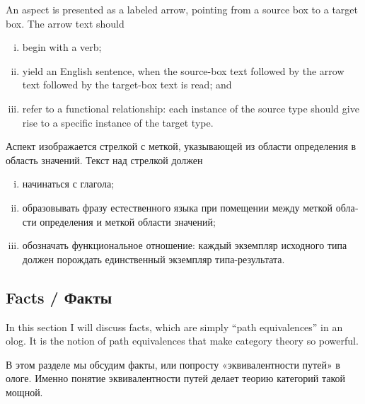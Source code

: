 \documentclass{book}
\theoremstyle{theoremENG}
\theoremstyle{lemmaENG}
\theoremstyle{propositionENG}
\theoremstyle{corollaryENG}
\theoremstyle{factENG}
\theoremstyle{remarkENG}
\theoremstyle{exampleENG}
\theoremstyle{warningENG}
\theoremstyle{questionENG}
\theoremstyle{guessENG}
\theoremstyle{answerENG}
\theoremstyle{constructionENG}
\theoremstyle{rulesENG}
\newtheorem{rulesENG}[subsubsection]{\begin{english}Rules of good practice\end{english}}
\theoremstyle{excENG}
\theoremstyle{appENG}
\theoremstyle{definitionENG}
\theoremstyle{notationENG}
\theoremstyle{conjectureENG}
\theoremstyle{postulateENG}
\theoremstyle{theoremRUS}
\theoremstyle{lemmaRUS}
\theoremstyle{propositionRUS}
\theoremstyle{corollaryRUS}
\theoremstyle{factRUS}
\theoremstyle{remarkRUS}
\theoremstyle{exampleRUS}
\theoremstyle{warningRUS}
\theoremstyle{questionRUS}
\theoremstyle{guessRUS}
\theoremstyle{answerRUS}
\theoremstyle{constructionRUS}
\theoremstyle{rulesRUS}
\newtheorem{rulesRUS}[subsubsection]{\begin{russian}Рекомендации\end{russian}}
\theoremstyle{excRUS}
\theoremstyle{appRUS}
\theoremstyle{definitionRUS}
\theoremstyle{notationRUS}
\theoremstyle{conjectureRUS}
\theoremstyle{postulateRUS}
\begin{document}
\begin{english}
\begin{rulesENG}\label{rules:aspects}
An aspect is presented as a labeled arrow, pointing from a source box to a target box.  The arrow text should
\begin{enumerate}[(i)]
\item begin with a verb;
\item yield an English sentence, when the source-box text followed by the arrow text followed by the target-box text is read; and
\item refer to a functional relationship: each instance of the source type should give rise to a specific instance of the target type.
\end{enumerate}
\end{rulesENG}

\begin{rulesRUS}\label{rules:aspects}
\begin{russian}Аспект изображается стрелкой с меткой, указывающей из области определения в область значений.  Текст над стрелкой должен
\begin{enumerate}[(i)]
\item начинаться с глагола;
\item образовывать фразу естественного языка при помещении между меткой области определения и меткой области значений;
\item обозначать функциональное отношение: каждый экземпляр исходного типа должен порождать единственный экземпляр типа-результата.
\end{enumerate}\end{russian}
\end{rulesRUS}


\subsection{Facts / Факты}\label{sec:facts}

In this section I will discuss facts, which are simply “path equivalences” in an olog. It is the notion of path equivalences that make category theory so powerful. 

\begin{russian}В этом разделе мы обсудим факты, или попросту «эквивалентности путей» в ологе. Именно понятие эквивалентности путей делает теорию категорий такой мощной. \end{russian}


\end{english}
\end{document}
